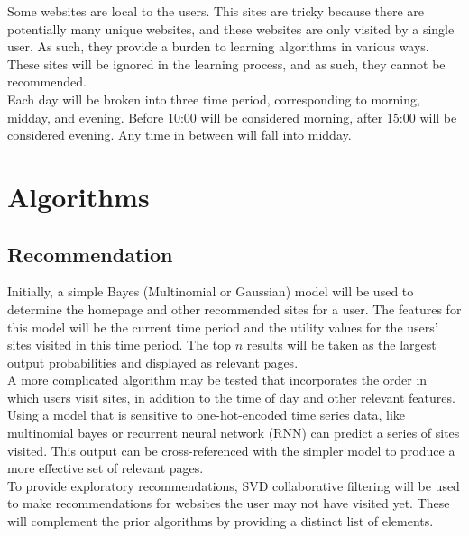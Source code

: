\documentclass{article}
\begin{document}
Some websites are local to the users. This sites are tricky because there are 
potentially many unique websites, and these websites are only visited by a 
single user. As such, they provide a burden to learning algorithms in various
ways. These sites will be ignored in the learning process, and as such, they 
cannot be recommended. \\

Each day will be broken into three time period, corresponding to morning, midday,
and evening. Before 10:00 will be considered morning, after 15:00 will be considered
evening. Any time in between will fall into midday. 


\clearpage
\section*{Algorithms}
\subsection*{Recommendation}
Initially, a simple Bayes (Multinomial or Gaussian) model will be used to 
determine the homepage and other recommended sites for a user. The features
for this model will be the current time period and the utility values for the 
users' sites visited in this time period. The top $n$ results will be taken
as the largest output probabilities and displayed as relevant pages. \\

A more complicated algorithm may be tested that incorporates the order in which
users visit sites, in addition to the time of day and other relevant features. 
Using a model that is sensitive to one-hot-encoded time series data, like multinomial
bayes or recurrent neural network (RNN) can predict a series of sites visited.
This output can be cross-referenced with the simpler model to produce a more
effective set of relevant pages. \\

To provide exploratory recommendations, SVD collaborative filtering will be used to 
make recommendations for websites the user may not have visited yet. These 
will complement the prior algorithms by providing a distinct list of elements. \\


\clearpage
\end{document}
